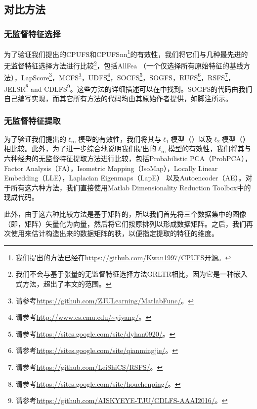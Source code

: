 \subsection{对比方法}

\subsubsection{无监督特征选择}
为了验证我们提出的CPUFS和CPUFSnn\footnote{我们提出的方法已经在\url{https://github.com/Kwan1997/CPUFS}开源。}的有效性，我们将它们与几种最先进的无监督特征选择方法进行比较\footnote{我们不会与基于张量的无监督特征选择方法GRLTR相比，因为它是一种嵌入式方法，超出了本文的范围。}，包括AllFea （一个仅选择所有原始特征的基线方法），LapScore\footnote{\label{foot:dengcai}请参考\url{https://github.com/ZJULearning/MatlabFunc/}。}，MCFS\textsuperscript{\ref{foot:dengcai}}，UDFS\footnote{请参考\url{http://www.cs.cmu.edu/~yiyang/}。}，SOCFS\footnote{请参考\url{https://sites.google.com/site/dyhan0920/}。}，SOGFS，RUFS\footnote{请参考\url{https://sites.google.com/site/qianmingjie/}。}，RSFS\footnote{请参考\url{https://github.com/LeiShiCS/RSFS/}。}， JELSR\footnote{请参考\url{https://sites.google.com/site/houchenping/}。} and CDLFS\footnote{请参考\url{https://github.com/AISKYEYE-TJU/CDLFS-AAAI2016/}。}。这些方法的详细描述可以在中找到。SOGFS的代码由我们自己编写实现，而其它所有方法的代码均由其原始作者提供，如脚注所示。

\subsubsection{无监督特征提取}
为了验证我们提出的$\ell_{\infty}$模型的有效性，我们将其与$\ell_{1}$模型（）以及$\ell_{2}$模型（）相比较。此外，为了进一步综合地说明我们提出的$\ell_{\infty}$模型的有效性，我们将其与六种经典的无监督特征提取方法进行比较，包括Probabilistic PCA（ProbPCA），Factor Analysis（FA），Isometric Mapping（IsoMap），Locally Linear Embedding（LLE），Laplacian Eigenmaps（LapE） 以及Autoencoder（AE）。对于所有这六种方法，我们直接使用Matlab Dimensionality Reduction Toolbox中的现成代码。

此外，由于这六种比较方法是基于矩阵的，所以我们首先将三个数据集中的图像（即，矩阵）矢量化为向量，然后将它们按原排列以形成数据矩阵。之后，我们再次使用来估计构造出来的数据矩阵的秩，以便指定提取的特征的维度。

